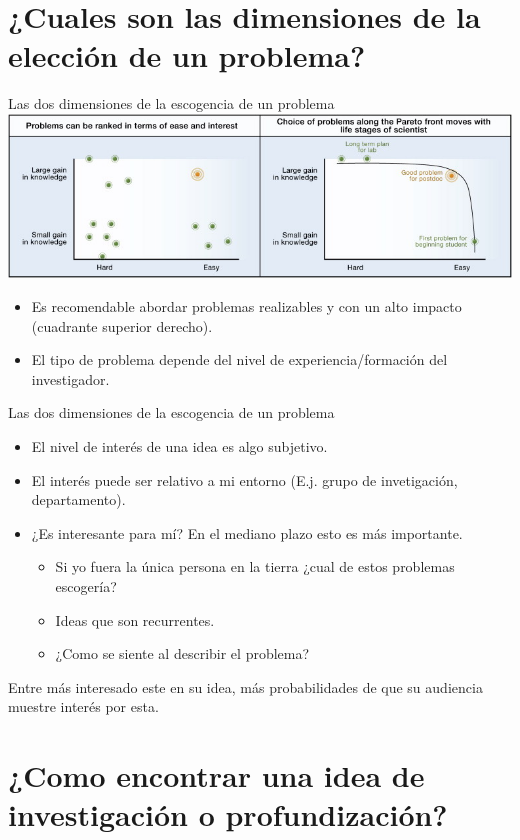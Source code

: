 \documentclass [xcolor=svgnames, t] {beamer}
\begin{document}
\section{¿Cuales son las dimensiones de la elecci\'on de un problema?}
\begin{frame}{Las dos dimensiones de la escogencia de un problema}
\includegraphics[width=\textwidth]{fig3_2}
\begin{itemize}
\item \alert{Es recomendable abordar problemas realizables y con un alto impacto (cuadrante superior derecho).}
\item El tipo de problema depende del nivel de experiencia/formaci\'on del investigador.
\end{itemize}
\end{frame}

\begin{frame}{Las dos dimensiones de la escogencia de un problema}
\begin{itemize}
\item El nivel de inter\'es de una idea es algo subjetivo.
\item El inter\'es puede ser relativo a mi entorno (E.j. grupo de invetigaci\'on, departamento).
\item \alert{¿Es interesante para m\'i? En el mediano plazo esto es m\'as importante.}
\begin{itemize}
\item Si yo fuera la \'unica persona en la tierra ¿cual de estos problemas escoger\'ia?
\item Ideas que son recurrentes.
\item ¿Como se siente al describir el problema?
\end{itemize}
\end{itemize}
\centering
\alert{Entre m\'as interesado este en su idea, m\'as probabilidades de que su audiencia muestre inter\'es por esta.}
\end{frame}

\section{¿Como encontrar una idea de investigaci\'on o profundizaci\'on?}
\end{document}
